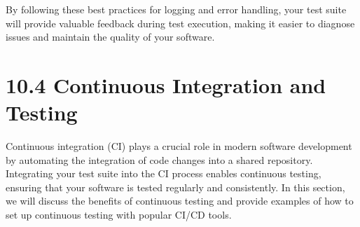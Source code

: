 \documentclass[
  paper=a4,
  ,captions=tableheading
]{scrartcl}
\begin{document}
By following these best practices for logging and error handling, your
test suite will provide valuable feedback during test execution, making
it easier to diagnose issues and maintain the quality of your software.

\hypertarget{continuous-integration-and-testing}{%
\section{10.4 Continuous Integration and
Testing}\label{continuous-integration-and-testing}}

Continuous integration (CI) plays a crucial role in modern software
development by automating the integration of code changes into a shared
repository. Integrating your test suite into the CI process enables
continuous testing, ensuring that your software is tested regularly and
consistently. In this section, we will discuss the benefits of
continuous testing and provide examples of how to set up continuous
testing with popular CI/CD tools.
\end{document}
